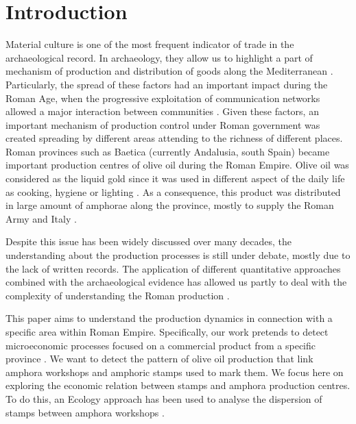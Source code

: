 \documentclass[review]{elsarticle}
\begin{document}
\section{Introduction}


Material culture is one of the most frequent indicator of trade in the archaeological record. In archaeology, they allow us to highlight a part of mechanism of production and distribution of goods along the Mediterranean \citep{bevan_mediterranean_2014}. Particularly, the spread of these factors had an important impact during the Roman Age, when the progressive exploitation of communication networks allowed a major interaction between communities \citep{orengo_seeds_2016}. Given these factors, an important mechanism of production control under Roman government was created spreading by different areas attending to the richness of different places. Roman provinces such as Baetica (currently Andalusia, south Spain) became important production centres of olive oil during the Roman Empire. Olive oil was considered as the liquid gold since it was used in different aspect of the daily life as cooking, hygiene or lighting  \citep{mattingly_d.j._oil_1988}. As a consequence, this product was distributed in large amount of amphorae along the province, mostly to supply the Roman Army and Italy \citep{blazquez_exportacion_1980}. 


Despite this issue has been widely discussed over many decades, the understanding about the production processes is still under debate, mostly due to the lack of written records. The application of different quantitative approaches combined with the archaeological evidence has allowed us partly to deal with the complexity of understanding the Roman production \citep{orengo_seeds_2016,
brughmans_roman_2016,coto-sarmiento_identifying_2018,bayesian_2018}.



This paper aims to understand the production dynamics in connection with a specific area within Roman Empire. Specifically, our work pretends to detect microeconomic processes focused on a commercial product from a specific province \citep{isaksen_network_2006}. We want to detect the pattern of olive oil production that link amphora workshops and amphoric stamps used to mark them. We focus here on exploring the economic relation between stamps and amphora production centres. To do this, an Ecology approach has been used to analyse the dispersion of stamps between amphora workshops \citep{rubio-campillo_ecology_2018}. 
\end{document}
